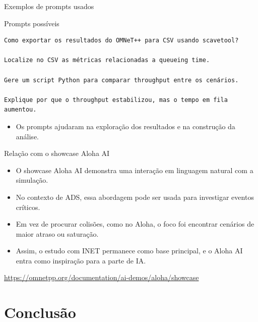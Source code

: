 \documentclass[aspectratio=169]{beamer}
\begin{document}
\begin{frame}[fragile]{Exemplos de prompts usados}

\small
\begin{block}{Prompts possíveis}
\begin{verbatim}
Como exportar os resultados do OMNeT++ para CSV usando scavetool?

Localize no CSV as métricas relacionadas a queueing time.

Gere um script Python para comparar throughput entre os cenários.

Explique por que o throughput estabilizou, mas o tempo em fila aumentou.
\end{verbatim}
\end{block}

\vspace{0.3cm}  

\begin{itemize}
    \item Os prompts ajudaram na exploração dos resultados e na construção da análise.
\end{itemize}
\end{frame}

\begin{frame}{Relação com o showcase Aloha AI}
\begin{itemize}
    \item O showcase Aloha AI demonstra uma interação em linguagem natural com a simulação.
    \item No contexto de ADS, essa abordagem pode ser usada para investigar eventos críticos.
    \item Em vez de procurar colisões, como no Aloha, o foco foi encontrar cenários de maior atraso ou saturação.
    \item Assim, o estudo com INET permanece como base principal, e o Aloha AI entra como inspiração para a parte de IA.
\end{itemize}

\vspace{0.4cm}

\centering
\small
\url{https://omnetpp.org/documentation/ai-demos/aloha/showcase}
\end{frame}


\section{Conclusão}
\end{document}
